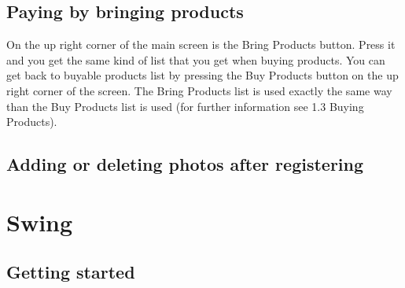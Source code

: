 \documentclass[11pt]{article}
\begin{document}
\subsection{Paying by bringing products}

On the up right corner of the main screen is the Bring Products button. Press it and you get the same kind of list that you get when buying products. You can get back to buyable products list by pressing the Buy Products button on the up right corner of the screen. The Bring Products list is used exactly the same way than the Buy Products list is used (for further information see 1.3 Buying Products).

\subsection{Adding or deleting photos after registering}

\section{Swing}
\subsection{Getting started}
\end{document}
